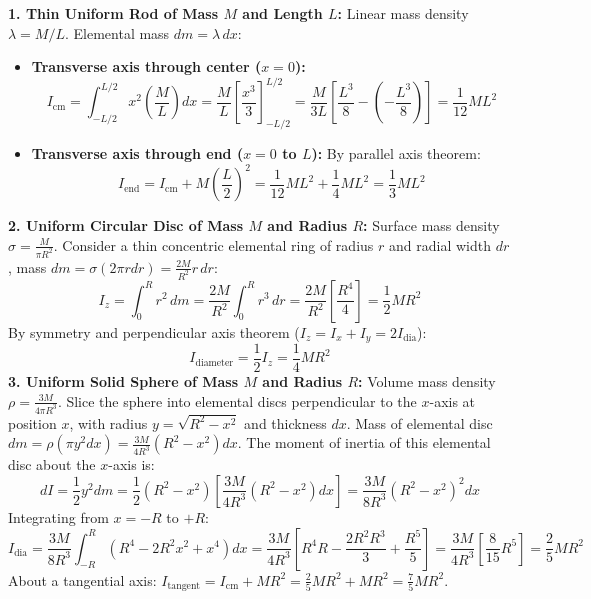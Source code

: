 \documentclass[10pt,a4paper]{article}
\begin{document}
\begin{formulabox}
\textbf{1. Thin Uniform Rod of Mass $M$ and Length $L$:}
Linear mass density $\lambda = M/L$. Elemental mass $dm = \lambda\,dx$:
\begin{itemize}
  \item \textbf{Transverse axis through center ($x = 0$):}
  \begin{equation}
    I_{\text{cm}} = \int_{-L/2}^{L/2} x^2 \left(\frac{M}{L}\right)dx = \frac{M}{L}\left[\frac{x^3}{3}\right]_{-L/2}^{L/2} = \frac{M}{3L}\left[\frac{L^3}{8} - \left(-\frac{L^3}{8}\right)\right] = \frac{1}{12}ML^2
  \end{equation}
  \item \textbf{Transverse axis through end ($x = 0$ to $L$):} By parallel axis theorem:
  \begin{equation}
    I_{\text{end}} = I_{\text{cm}} + M\left(\frac{L}{2}\right)^2 = \frac{1}{12}ML^2 + \frac{1}{4}ML^2 = \frac{1}{3}ML^2
  \end{equation}
\end{itemize}
\textbf{2. Uniform Circular Disc of Mass $M$ and Radius $R$:}
Surface mass density $\sigma = \frac{M}{\pi R^2}$. Consider a thin concentric elemental ring of radius $r$ and radial width $dr$, mass $dm = \sigma(2\pi r dr) = \frac{2M}{R^2}r\,dr$:
\begin{equation}
  I_z = \int_0^R r^2\,dm = \frac{2M}{R^2}\int_0^R r^3\,dr = \frac{2M}{R^2}\left[\frac{R^4}{4}\right] = \frac{1}{2}MR^2
\end{equation}
By symmetry and perpendicular axis theorem ($I_z = I_x + I_y = 2I_{\text{dia}}$):
\begin{equation}
  I_{\text{diameter}} = \frac{1}{2}I_z = \frac{1}{4}MR^2
\end{equation}
\textbf{3. Uniform Solid Sphere of Mass $M$ and Radius $R$:}
Volume mass density $\rho = \frac{3M}{4\pi R^3}$. Slice the sphere into elemental discs perpendicular to the $x$-axis at position $x$, with radius $y = \sqrt{R^2 - x^2}$ and thickness $dx$.
Mass of elemental disc $dm = \rho(\pi y^2 dx) = \frac{3M}{4R^3}(R^2 - x^2)dx$.
The moment of inertia of this elemental disc about the $x$-axis is:
\begin{equation}
  dI = \frac{1}{2}y^2 dm = \frac{1}{2}(R^2 - x^2)\left[\frac{3M}{4R^3}(R^2 - x^2)dx\right] = \frac{3M}{8R^3}(R^2 - x^2)^2 dx
\end{equation}
Integrating from $x = -R$ to $+R$:
\begin{equation}
  I_{\text{dia}} = \frac{3M}{8R^3}\int_{-R}^{R} (R^4 - 2R^2 x^2 + x^4)dx = \frac{3M}{4R^3}\left[R^4 R - \frac{2R^2 R^3}{3} + \frac{R^5}{5}\right] = \frac{3M}{4R^3}\left[\frac{8}{15}R^5\right] = \frac{2}{5}MR^2
\end{equation}
About a tangential axis: $I_{\text{tangent}} = I_{\text{cm}} + MR^2 = \frac{2}{5}MR^2 + MR^2 = \frac{7}{5}MR^2$.


\end{formulabox}
\end{document}
